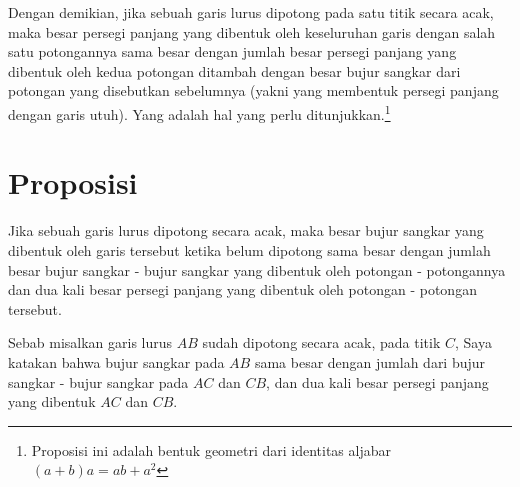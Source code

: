 \documentclass[a4paper]{book}
\begin{document}
Dengan demikian, jika sebuah garis lurus dipotong pada satu titik secara acak, 
maka besar persegi panjang yang dibentuk oleh keseluruhan garis dengan salah satu
potongannya sama besar dengan jumlah besar persegi panjang yang dibentuk oleh 
kedua potongan ditambah dengan besar bujur sangkar dari potongan yang 
disebutkan sebelumnya (yakni yang membentuk persegi panjang dengan garis utuh). 
Yang adalah hal yang perlu ditunjukkan.\footnote{Proposisi ini adalah bentuk 
geometri dari identitas aljabar $(a+b)a = ab + a^2$}

\section*{\centering Proposisi \thesection} 
Jika sebuah garis lurus dipotong secara acak, maka besar bujur sangkar yang dibentuk
oleh garis tersebut ketika belum dipotong sama besar dengan jumlah besar 
bujur sangkar - bujur sangkar
yang dibentuk oleh potongan - potongannya dan dua kali besar persegi panjang 
yang dibentuk oleh potongan - potongan tersebut.

\begin{center}
\end{center}

Sebab misalkan garis lurus $AB$ sudah dipotong secara acak, pada titik $C$, Saya
katakan bahwa bujur sangkar pada $AB$ sama besar dengan jumlah dari 
bujur sangkar - bujur sangkar pada $AC$ dan $CB$, dan dua kali besar persegi panjang
yang dibentuk $AC$ dan $CB$.
\end{document}
